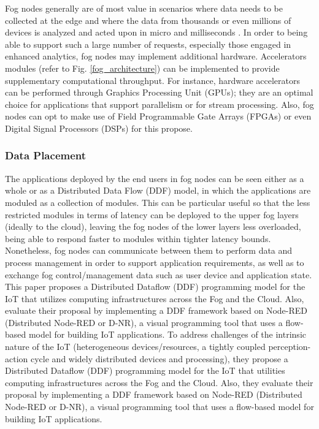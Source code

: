 \noindent\tab Fog nodes generally are of most value in scenarios where data needs to be collected at the edge and where the data from thousands or even millions of devices is analyzed and acted upon in micro and milliseconds \cite{openfog2017openfog}. In order to being able to support such a large number of requests, especially those engaged in enhanced analytics, fog nodes may implement additional hardware. Accelerators modules (refer to Fig. \ref{fog_architecture}) can be implemented to provide supplementary computational throughput. For instance, hardware accelerators can be performed through Graphics Processing Unit (GPUs); they are an optimal choice for applications that support parallelism or for stream processing. Also, fog nodes can opt to make use of Field Programmable Gate Arrays (FPGAs) or even Digital Signal Processors (DSPs) for this propose.

\subsubsection{Data Placement}
\noindent\tab The applications deployed by the end users in fog nodes can be seen either as a whole or as a Distributed Data Flow (DDF) model, in which the applications are moduled as a collection of modules. This can be particular useful so that the less restricted modules in terms of latency can be deployed to the upper fog layers (ideally to the cloud), leaving the fog nodes of the lower layers less overloaded, being able to respond faster to modules within tighter latency bounds. Nonetheless, fog nodes can communicate between them to perform data and process management in order to support application requirements, as well as to exchange fog control/management data such as user device and application state.\\






\cite{giang2015developing}
This paper proposes a Distributed Dataflow (DDF) programming model for the IoT that utilizes computing infrastructures across the Fog and the Cloud. Also, evaluate their proposal by implementing a DDF framework based on Node-RED (Distributed Node-RED or D-NR), a visual programming tool that uses a flow-based model for building IoT applications. To address challenges of the intrinsic nature of the IoT (heterogeneous devices/resources, a tightly coupled perception-action cycle and widely distributed devices and processing), they propose a Distributed Dataflow (DDF) programming model for the IoT that utilities computing infrastructures across the Fog and the Cloud. Also, they evaluate their proposal by implementing a DDF framework based on Node-RED (Distributed Node-RED or D-NR), a visual programming tool that uses a flow-based model for building IoT applications.\\

